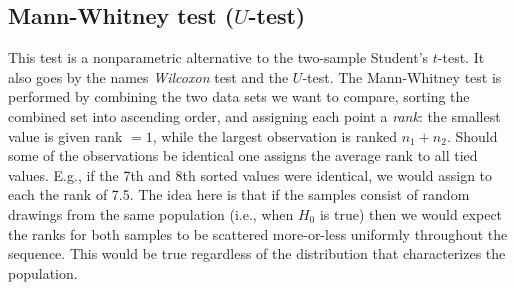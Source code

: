 \subsection{Mann-Whitney test ($U$-test)}

	This test is a nonparametric alternative to the two-sample Student's $t$-test.  It also goes by the 
names \emph{Wilcoxon} test and the $U$-test.  The Mann-Whitney test is performed by combining the two 
data sets we want to compare, sorting the combined set into ascending order, and assigning each point a \emph{rank}: 
the smallest value is given rank $= 1$, while the largest observation is ranked $n_1 + n_2$.  Should some of the 
observations be identical one assigns the average rank to all tied values.  E.g., if the 7th and 8th 
sorted values were identical, we would assign to each the rank of 7.5.  The idea here is that if the samples 
consist of random drawings from the same population (i.e., when $H_0$ is true) then we would expect the ranks for both 
samples to be scattered more-or-less uniformly throughout the sequence.  This would be true regardless of the
distribution that characterizes the population.

